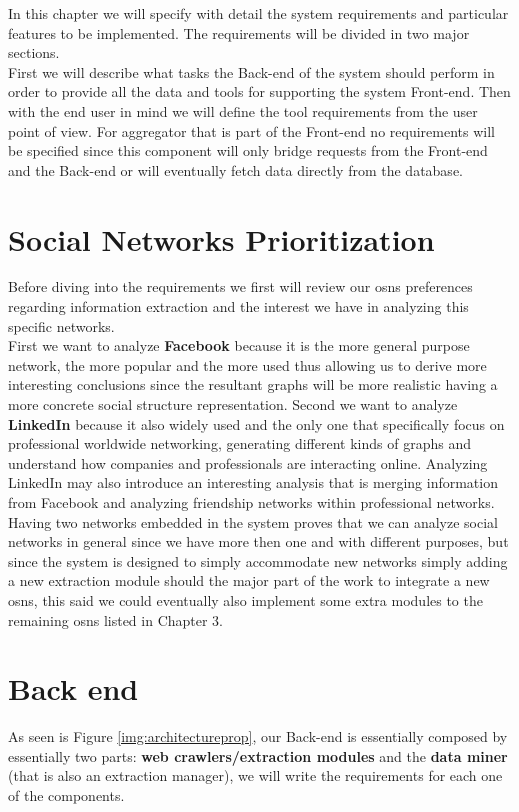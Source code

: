 In this chapter we will specify with detail the system requirements and particular features to be implemented. The requirements
will be divided in two major sections.\\
\indent First we will describe what tasks the Back-end of the system should perform in order to provide
all the data and tools for supporting the system Front-end. Then with the end user in mind we will define the tool requirements from
the user point of view. For aggregator that is part of the Front-end no requirements will be specified since this component will only bridge
requests from the Front-end and the Back-end or will eventually fetch data directly from the database.

\section{Social Networks Prioritization}
Before diving into the requirements we first will review our \glspl{osn} preferences regarding information extraction and the
interest we have in analyzing this specific networks.\\
\indent First we want to analyze \textbf{Facebook} because it is the more general purpose network, the more popular and the more used
thus allowing us to derive more interesting conclusions since the resultant graphs will be more realistic having a more concrete social structure
representation. Second we want to analyze \textbf{LinkedIn} because it also widely used and the only one that specifically
focus on professional worldwide networking, generating different kinds of graphs and understand how companies and professionals
are interacting online. Analyzing LinkedIn may also introduce an interesting analysis that is merging information from Facebook and
analyzing friendship networks within professional networks.\\
\indent Having two networks embedded in the system proves that we can analyze social networks in general since we have more
then one and with different purposes, but since the system is designed to simply accommodate new networks simply adding
a new extraction module should the major part of the work to integrate a new \glspl{osn}, this said we could eventually
also implement some extra modules to the remaining \glspl{osn} listed in Chapter 3.

\section{Back end}
As seen is Figure \ref{img:architectureprop}, our Back-end is essentially composed by essentially two parts: \textbf{web crawlers/extraction modules} and the \textbf{data miner} (that is also an extraction manager), we will write the requirements for each one of the components.

